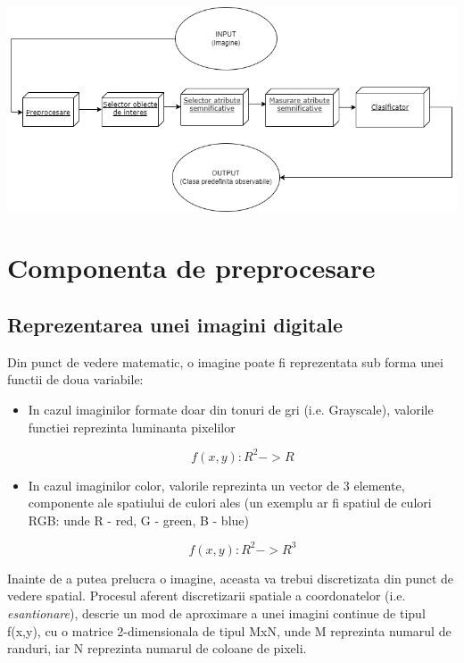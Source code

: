 \documentclass[10pt]{article}
\begin{document}
\includegraphics[scale=0.5]{componente}


\newpage

\section{Componenta de preprocesare}\label{sec:3}

\subsection{Reprezentarea unei imagini digitale}

\> Din punct de vedere matematic, o imagine poate fi reprezentata sub forma unei
functii de doua variabile:

\begin{itemize}
	\item In cazul imaginilor formate doar din tonuri de gri (i.e. Grayscale),
	valorile functiei reprezinta luminanta pixelilor
	
	\begin{equation}\label{eq:1}
		f(x,y) : R^2 -> R
	\end{equation}

	\item In cazul imaginilor color, valorile reprezinta un vector de 3 elemente,
componente ale spatiului de culori ales (un exemplu ar fi spatiul de culori RGB:
unde R - red, G - green, B - blue)

	\begin{equation}\label{eq:2}
		f(x,y) : R^2 -> R^3
	\end{equation}

\end{itemize}

\> Inainte de a putea prelucra o imagine, aceasta va trebui discretizata din punct
de vedere spatial. Procesul aferent discretizarii spatiale a
coordonatelor (i.e. {\it esantionare}), descrie un mod de aproximare a unei imagini continue
de tipul f(x,y), cu o matrice 2-dimensionala de tipul MxN, unde M reprezinta numarul de randuri,
iar N reprezinta numarul de coloane de pixeli.
\end{document}

